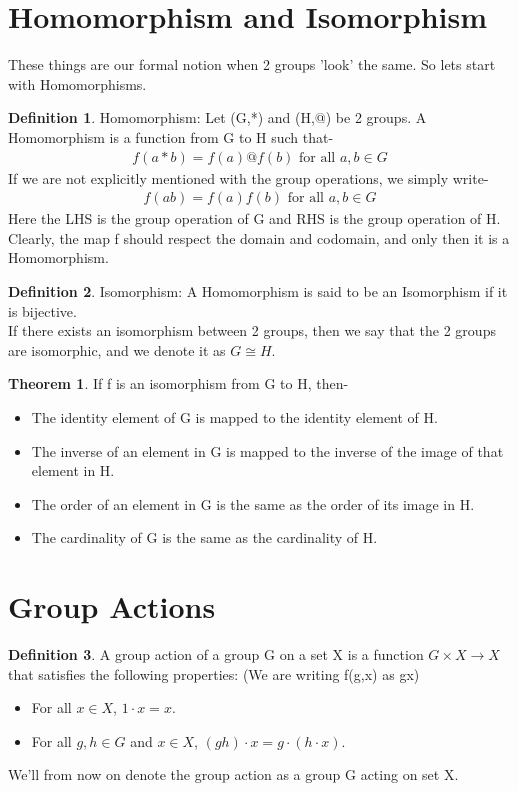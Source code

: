 \documentclass[12pt,a4paper,oneside]{report}
\theoremstyle{definition}
\newtheorem{definition}{Definition}[chapter]
\newtheorem{theorem}{Theorem}
\begin{document}
\section{Homomorphism and Isomorphism}
These things are our formal notion when 2 groups 'look' the same. So lets start with Homomorphisms.
\begin{definition}{Homomorphism: }
Let (G,*) and (H,@) be 2 groups. A Homomorphism is a function from G to H such that-
\begin{align*}
  f(a*b)=f(a)@f(b) \text{ for all } a,b \in G
\end{align*}
If we are not explicitly mentioned with the group operations, we simply write-
\begin{align*}
  f(ab)=f(a)f(b) \text{ for all } a,b \in G
\end{align*}
Here the LHS is the group operation of G and RHS is the group operation of H.
\\Clearly, the map f should respect the domain and codomain, and only then it is a Homomorphism.
\end{definition}
\begin{definition}{Isomorphism: }
A Homomorphism is said to be an Isomorphism if it is bijective.
\\If there exists an isomorphism between 2 groups, then we say that the 2 groups are isomorphic, and we denote it as $G \cong H$.
\end{definition}
\begin{theorem}
  If f is an isomorphism from G to H, then-
  \begin{itemize}
    \item The identity element of G is mapped to the identity element of H.
    \item The inverse of an element in G is mapped to the inverse of the image of that element in H.
    \item The order of an element in G is the same as the order of its image in H.
    \item The cardinality of G is the same as the cardinality of H.
  \end{itemize}
\end{theorem}
\section{Group Actions}
\begin{definition}
  A group action of a group G on a set X is a function $G \times X \rightarrow X$ that satisfies the following properties: (We are writing f(g,x) as gx)
  \begin{itemize}
    \item For all $x \in X$, $1 \cdot x = x$.
    \item For all $g, h \in G$ and $x \in X$, $(gh) \cdot x = g \cdot (h \cdot x)$.
  \end{itemize}
\end{definition}
We'll from now on denote the group action as a group G acting on set X.
\end{document}
